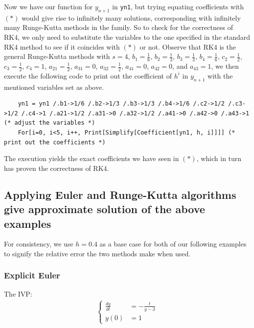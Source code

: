 \documentclass[a4paper]{article}
\numberwithin{equation}{section}
\begin{document}
Now we have our function for \( y_{n+1} \) in \texttt{yn1}, but trying equating coefficients with \( (*) \) would give rise to infinitely many solutions, corresponding with infinitely many Runge-Kutta methods in the family. So to check for the correctness of RK4, we only need to substitute the variables to the one specified in the standard RK4 method to see if it coincides with \( (*) \) or not. Observe that RK4 is the general Runge-Kutta methods with \( s = 4 \), \( b_1 = \frac{1}{6} \), \( b_2 = \frac{1}{3} \), \( b_3 = \frac{1}{3} \), \( b_4 = \frac{1}{6} \), \( c_2 = \frac{1}{2} \), \( c_3 = \frac{1}{2} \), \( c_4 = 1 \), \( a_{21} = \frac{1}{2} \), \( a_{31} = 0 \), \( a_{32} = \frac{1}{2} \), \( a_{41} = 0 \), \( a_{42} = 0 \), and \( a_{43} = 1 \), we then execute the following code to print out the coefficient of \( h^i \) in \( y_{n+1} \) with the mentioned variables set as above.
\begin{mdframed}[leftline=false,rightline=false,backgroundcolor=magenta!10,nobreak=true]
  \begin{verbatim}
    yn1 = yn1 /.b1->1/6 /.b2->1/3 /.b3->1/3 /.b4->1/6 /.c2->1/2 /.c3->1/2 /.c4->1 /.a21->1/2 /.a31->0 /.a32->1/2 /.a41->0 /.a42->0 /.a43->1 (* adjust the variables *)
    For[i=0, i<5, i++, Print[Simplify[Coefficient[yn1, h, i]]]] (* print out the coefficients *)
  \end{verbatim}
\end{mdframed}

The execution yields the exact coefficients we have seen in \( (*) \), which in turn has proven the correctness of RK4.

\subsection{Applying Euler and Runge-Kutta algorithms give approximate solution of the above examples}
For consistency, we use \( h = 0.4 \) as a base case for both of our following examples to signify the relative error the two methods make when used.

\subsubsection{Explicit Euler}
The IVP:
\begin{align*}
  \begin{cases}
    \frac{dy}{dt} & = - \frac{t}{y - 3} \\
    y(0)          & = 1
  \end{cases}
\end{align*}
\end{document}
